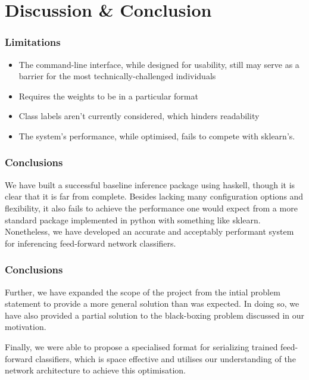 \documentclass{beamer}
\begin{document}
\section{Discussion \& Conclusion}

\begin{frame}
  \frametitle{Limitations}
  \begin{itemize}
    \item The command-line interface, while designed for usability, still may serve as a barrier for the most technically-challenged individuals
    \item Requires the weights to be in a particular format
    \item Class labels aren't currently considered, which hinders readability
    \item The system's performance, while optimised, fails to compete with sklearn's.
  \end{itemize}
\end{frame}

\begin{frame}
  \frametitle{Conclusions}
  We have built a successful baseline inference package using haskell, though it is clear that it is far from complete. Besides lacking many configuration options and flexibility, it also fails to achieve the performance one would expect from a more standard package implemented in python with something like sklearn. Nonetheless, we have developed an accurate and acceptably performant system for inferencing feed-forward network classifiers.
\end{frame}

\begin{frame}
  \frametitle{Conclusions}
  Further, we have expanded the scope of the project from the intial problem statement to provide a more general solution than was expected. In doing so, we have also provided a partial solution to the black-boxing problem discussed in our motivation.\bigskip

  Finally, we were able to propose a specialised format for serializing trained feed-forward classifiers, which is space effective and utilises our understanding of the network architecture to achieve this optimisation.
\end{frame}
\end{document}
